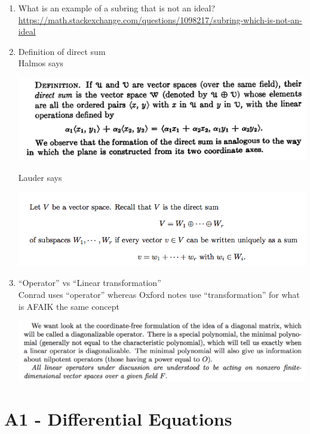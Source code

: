 \documentclass[12pt]{article}
\begin{document}
\begin{enumerate}
{    transformation; it's basis-independent. Algebraically,
    $f(P^\1AP) = \sum_i a_i(P^\1AP)^i = \sum_i a_iP^\1A^iP = P^\1\Big(\sum_ia_iA^i\Big)P =
    P^\1f(A)P$.}
\item What is an example of a subring that is not an ideal?\\
  \url{https://math.stackexchange.com/questions/1098217/subring-which-is-not-an-ideal}
\item Definition of direct sum\\
  Halmos says
  \begin{mdframed}
    \includegraphics[width=400pt]{img/question-linear-algebra-a0-direct-sum-halmos.png}
  \end{mdframed}
  Lauder says
  \begin{mdframed}
    \includegraphics[width=400pt]{img/question-linear-algebra-a0-direct-sum-lauder.png}
  \end{mdframed}
\item ``Operator'' vs ``Linear transformation''\\
  Conrad uses ``operator'' whereas Oxford notes use ``transformation'' for what is AFAIK the same
  concept
  \begin{mdframed}
    \includegraphics[width=400pt]{img/question-linear-algebra-a0-operator-halmos.png}
  \end{mdframed}
\end{enumerate}


\section{A1 - Differential Equations}
\end{document}
